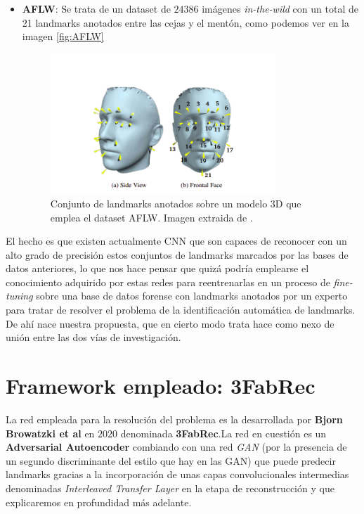 \begin{itemize}
    \item \textbf{AFLW}: Se trata de un dataset de $24386$ imágenes \textit{in-the-wild} con un total de 21 landmarks anotados entre las cejas y el mentón, como podemos ver en la imagen \autoref{fig:AFLW}  \cite{AFLW}
    \begin{figure}[!h]
        \centering
        \includegraphics[width=0.8\textwidth]{img/AFLW.png}
        \caption{Conjunto de landmarks anotados sobre un modelo $3$D que emplea el dataset AFLW. Imagen extraida de \cite{AFLW}.}
        \label{fig:AFLW}
    \end{figure}
    \end{itemize}

    \medskip

    \noindent El hecho es que existen actualmente CNN que son capaces de reconocer con un alto grado de precisión estos conjuntos de landmarks marcados por las bases de datos anteriores, lo que nos hace pensar que quizá podría emplearse el conocimiento adquirido por estas redes para reentrenarlas en un proceso de \textit{fine-tuning} sobre una base de datos forense con landmarks anotados por un experto para tratar de resolver el problema de la identificación automática de landmarks. De ahí nace nuestra propuesta, que en cierto modo trata hace como nexo de unión entre las dos vías de investigación. 


    \section{Framework empleado: 3FabRec }
        \noindent La red empleada para la resolución del problema es la desarrollada por \textbf{Bjorn Browatzki et al} en $2020$ \cite{browatzki20203fabrec} denominada \textbf{3FabRec}.La red en cuestión es un \textbf{Adversarial Autoencoder} combiando con una red \textit{GAN} (por la presencia de un segundo discriminante del estilo que hay en las GAN) que puede predecir landmarks gracias a la incorporación de unas capas convolucionales intermedias denominadas \textit{Interleaved Transfer Layer} en la etapa de reconstrucción y que explicaremos en profundidad más adelante.            

